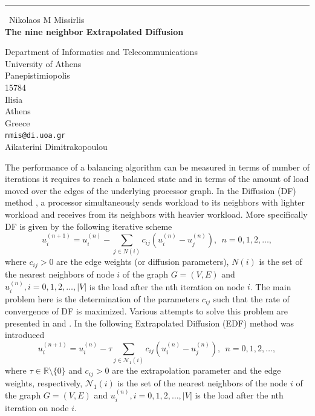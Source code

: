 \documentclass{report}
\begin{document}
\begin{center}
\rule{6in}{1pt} \
{\large Nikolaos M Missirlis \\
{\bf The nine neighbor Extrapolated Diffusion}}

Department of Informatics and Telecommunications \\ University of Athens \\ Panepistimiopolis \\ 15784 \\ Ilisia \\ Athens \\ Greece
\\
{\tt nmis@di.uoa.gr}\\
Aikaterini Dimitrakopoulou\end{center}

The performance of a balancing algorithm can
be measured in terms of number of iterations it requires to reach a
balanced state and in terms of the amount of load moved over the
edges of the underlying processor graph. In the Diffusion (DF)
method \cite{Cybe89}, \cite{Boil90} a processor simultaneously sends
workload to its neighbors with lighter workload and receives from
its neighbors with heavier workload.
More specifically DF is given by the
following iterative scheme
\begin{equation}
u^{(n+1)}_i = u^{(n)}_i - \sum_{j \in N(i)} c_{ij} (u^{(n)}_i-
u^{(n)}_j),\ \ n=0,1,2, \dots, \label{It:000}
\end{equation}
where $c_{ij} > 0$ are the edge weights (or diffusion parameters),
$N(i)$ is the set of the nearest neighbors of node $i$ of the graph
$G=(V,E)$ and $u^{(n)}_i, i=0,1,2, \dots,|V| $ is the load after the
nth iteration on node $i$. The main problem here is the
determination of the parameters $c_{ij}$ such that the rate of
convergence of DF is maximized.
Various attempts to solve this problem are presented in
\cite{Cybe89,Hong88,Diek97,Elsa04} and \cite{Xu97}.
In \cite{Kara04} the following Extrapolated Diffusion (EDF) method was introduced
\begin{equation}
u^{(n+1)}_i = u^{(n)}_i - \tau \sum_{j \in\mathcal{N}_1(i)} c_{ij} (u^{(n)}_i-
u^{(n)}_j),\ \ n=0,1,2, \dots, \label{It:00}
\end{equation}
where $\tau\in\mathbb{R}\setminus\{0\}$ and $c_{ij} > 0$ are the
extrapolation parameter and the edge weights,
respectively, $\mathcal{N}_1(i)$ is the set of the nearest neighbors of
the node $i$ of the graph $G=(V,E)$ and $u^{(n)}_i, i=0,1,2, \dots,|V| $
is the load after the
nth iteration on node $i$.
\end{document}
